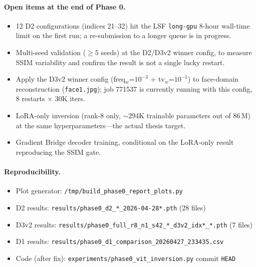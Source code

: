 \documentclass[11pt,a4paper]{article}
\begin{document}
\paragraph{Open items at the end of Phase 0.}
\begin{itemize}
  \item 12 D2 configurations (indices 21--32) hit the LSF \texttt{long-gpu} 8-hour wall-time limit on the first run; a re-submission to a longer queue is in progress.
  \item Multi-seed validation ($\geq 5$ seeds) at the D2/D3v2 winner config, to measure SSIM variability and confirm the result is not a single lucky restart.
  \item Apply the D3v2 winner config (freq$_w$=$10^{-3}$ + tv$_w$=$10^{-1}$) to face-domain reconstruction (\texttt{face1.jpg}); job 771537 is currently running with this config, 8 restarts $\times$ 30K iters.
  \item LoRA-only inversion (rank-8 only, $\sim$294K trainable parameters out of 86\,M) at the same hyperparameters---the actual thesis target.
  \item Gradient Bridge decoder training, conditional on the LoRA-only result reproducing the SSIM gate.
\end{itemize}

\paragraph{Reproducibility.}
\begin{itemize}
  \item Plot generator: \texttt{/tmp/build\_phase0\_report\_plots.py}
  \item D2 results: \texttt{results/phase0\_d2\_*\_2026-04-28*.pth} (28 files)
  \item D3v2 results: \texttt{results/phase0\_full\_r8\_n1\_s42\_*\_d3v2\_idx*\_*.pth} (7 files)
  \item D1 results: \texttt{results/phase0\_d1\_comparison\_20260427\_233435.csv}
  \item Code (after fix): \texttt{experiments/phase0\_vit\_inversion.py} commit \texttt{HEAD}
\end{itemize}
\end{document}
